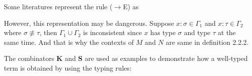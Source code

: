 Some literatures represent the rule ($ \to $E) as
\begin{prooftree}
\end{prooftree}
However, this representation may be dangerous. Suppose $ x: \sigma \in \Gamma _1 $ and $ x: \tau \in \Gamma _2 $ where $ \sigma \not\equiv \tau $, then $ \Gamma _1 \cup \Gamma _2 $ is inconsistent since $ x $ has type $ \sigma $ and type $ \tau $ at the same time. And that is why the contexts of $ M $ and $ N $ are same in definition 2.2.2.

The combinators  \textbf{K} and \textbf{S} are used as examples to demonstrate how a well-typed term is obtained by using the typing rules:
